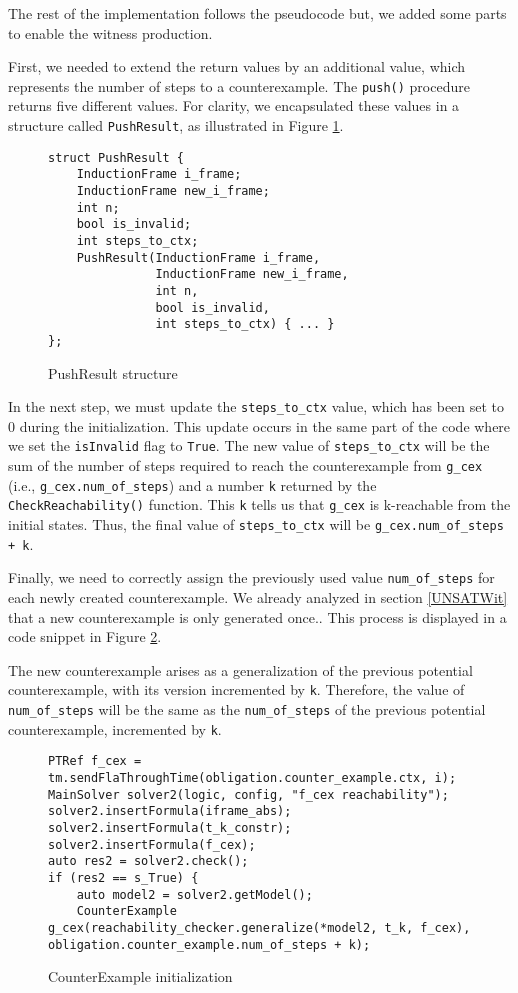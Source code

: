 The rest of the implementation follows the pseudocode but, we added some parts to enable the witness production. 

First, we needed to extend the return values by an additional value, which represents the number of steps to a counterexample. The \texttt{push()} procedure returns five different values. For clarity, we encapsulated these values in a structure called \texttt{PushResult}, as illustrated in Figure \ref{code:PushResult}.

\begin{figure}[H]
\begin{lstlisting}
struct PushResult {
    InductionFrame i_frame;
    InductionFrame new_i_frame;
    int n;
    bool is_invalid;
    int steps_to_ctx;
    PushResult(InductionFrame i_frame,
               InductionFrame new_i_frame,
               int n,
               bool is_invalid,
               int steps_to_ctx) { ... }
};
\end{lstlisting}
\caption{PushResult structure}\label{code:PushResult}
\end{figure}

In the next step, we must update the \texttt{steps\_to\_ctx} value, which has been set to 0 during the initialization. This update occurs in the same part of the code where we set the \texttt{isInvalid} flag to \texttt{True}. The new value of \texttt{steps\_to\_ctx} will be the sum of the number of steps required to reach the counterexample from \texttt{g\_cex} (i.e., \texttt{g\_cex.num\_of\_steps}) and a number \texttt{k} returned by the \texttt{CheckReachability()} function. This \texttt{k} tells us that \texttt{g\_cex} is k-reachable from the initial states. Thus, the final value of \texttt{steps\_to\_ctx} will be \texttt{g\_cex.num\_of\_steps + k}.

Finally, we need to correctly assign the previously used value \texttt{num\_of\_steps} for each newly created counterexample. We already analyzed in section \ref{UNSATWit} that a new counterexample is only generated once.. This process is displayed in a code snippet in Figure \ref{code:CEX}. 

The new counterexample arises as a generalization of the previous potential counterexample, with its version incremented by \texttt{k}.  Therefore, the value of \texttt{num\_of\_steps} will be the same as the \texttt{num\_of\_steps} of the previous potential counterexample, incremented by \texttt{k}.

\begin{figure}[H]
\begin{lstlisting}
PTRef f_cex = tm.sendFlaThroughTime(obligation.counter_example.ctx, i);
MainSolver solver2(logic, config, "f_cex reachability");
solver2.insertFormula(iframe_abs);
solver2.insertFormula(t_k_constr);
solver2.insertFormula(f_cex);
auto res2 = solver2.check();
if (res2 == s_True) {
    auto model2 = solver2.getModel();
    CounterExample g_cex(reachability_checker.generalize(*model2, t_k, f_cex), obligation.counter_example.num_of_steps + k);
\end{lstlisting}
\caption{CounterExample initialization}\label{code:CEX}
\end{figure}



